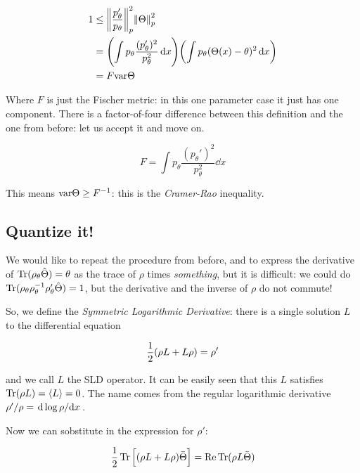 \documentclass[main.tex]{subfiles}
\begin{document}
\begin{align}
  1 &\leq \norm{\frac{p_\theta '}{p_\theta}}^{2}_p \norm{\Theta}^2_p  \\
  &= \qty(\int  p_\theta \frac{(p_\theta ')^2}{p_\theta^2} \dd{x} )
  \qty(\int p_\theta (\Theta(x) - \theta)^2 \dd{x} )  \\
  &= F \var{\Theta}
\end{align}

Where \( F \) is just the Fischer metric: %
in this one parameter case it just has one component. There is a factor-of-four difference between this definition and the one from before: let us accept it and move on.

\begin{equation}
    F = \int  p_\theta \frac{(p_\theta ')^2}{p_\theta^2} \dd{x}
\end{equation}

This means \(\text{var}{\Theta} \geq F ^{-1} \): this is the \emph{Cramer-Rao} inequality.

\subsection{Quantize it!}

We would like to repeat the procedure from before, and to express the derivative of \( \operatorname*{Tr} (\rho_\theta \hat{\Theta}) = \theta \) as the trace of \(\rho\) times \emph{something}, but it is difficult:
we could do \( \operatorname*{Tr} (\rho_\theta \rho_\theta ^{-1} \rho_\theta ' \hat{\Theta}) = 1 \),
but the derivative and the inverse of \(\rho\) do not commute!

So, we define the \emph{Symmetric Logarithmic Derivative}: there is a single solution \(L\) to the differential equation

\begin{equation} \label{eq:SLD-def}
  \frac{1}{2} \qty(\rho L + L \rho) = \rho'
\end{equation}

and we call \(L\) the SLD operator. It can be easily seen that this \(L\) satisfies \(\operatorname*{Tr}(\rho L) = \expval{L} =0 \).
The name comes from the regular logarithmic derivative \( \rho' / \rho = \dv*{\log \rho}{x} \).

Now we can sobstitute in the expression for \(\rho'\):

\begin{equation}
  \frac{1}{2} \Tr \qty[\qty(\rho L + L \rho) \bar{\Theta}] = \Re \Tr (\rho L \bar\Theta)
\end{equation}
\end{document}
